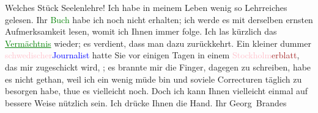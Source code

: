                     Welches Stück Seelenlehre! Ich habe in meinem {\pb}Leben wenig so Lehrreiches
                    gelesen.\pend
           \pstart
           Ihr \textcolor{green}{Buch}{} habe ich noch nicht
                    erhalten; ich werde es mit derselben ernsten Aufmerksamkeit lesen, womit ich
                    Ihnen immer folge. Ich las kürzlich das \textcolor{green}{\uline{Vermächtnis}}{}\ledrightnote{\textcolor{green}{Das Vermächtnis. Schauspiel in drei Akten}} wieder; es verdient, dass
                    man dazu zurückkehrt. Ein kleiner dummer \textcolor{pink}{schwedischer}{}\ledrightnote{\textcolor{pink}{Schweden}}{ }\textcolor{blue}{Journalist}{} hatte Sie vor
                    einigen Tagen in einem \textcolor{brown}{\textcolor{pink}{Stockholm}{}\ledrightnote{\textcolor{pink}{Stockholm}}erblatt}{}, das mir zugeschickt
                    wird, \label{K_L00916_1v}\label{K_L00916_1h}; es brannte mir die Finger, dagegen zu schreiben,
                    habe es nicht gethan, weil ich ein wenig müde bin und soviele Correcturen
                    täglich zu besorgen habe, thue es vielleicht noch. Doch ich kann Ihnen
                    vielleicht einmal auf bessere Weise nützlich sein.\pend
           \pstart
           Ich drücke Ihnen die Hand.\pend
           \pstart Ihr \spacefill\mbox{Georg Brandes}\pend{}\endnumbering{}  
      